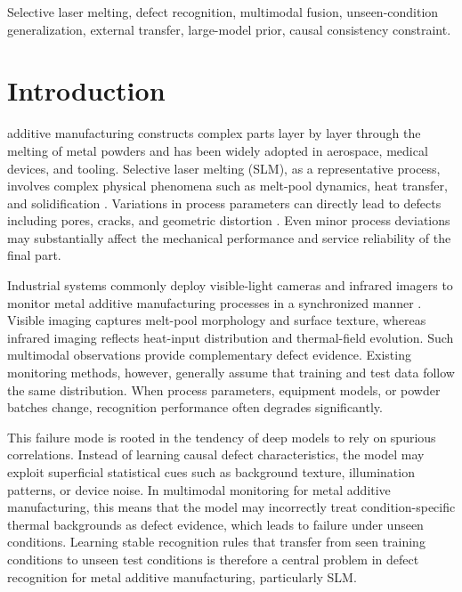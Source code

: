 \documentclass[journal]{IEEEtran}
\begin{document}
\begin{IEEEkeywords}
Selective laser melting, defect recognition, multimodal fusion, unseen-condition generalization, external transfer, large-model prior, causal consistency constraint.
\end{IEEEkeywords}

\section{Introduction}
 additive manufacturing constructs complex parts layer by layer through the melting of metal powders and has been widely adopted in aerospace, medical devices, and tooling. Selective laser melting (SLM), as a representative process, involves complex physical phenomena such as melt-pool dynamics, heat transfer, and solidification \cite{ref_defect_formation_slm}. Variations in process parameters can directly lead to defects including pores, cracks, and geometric distortion \cite{ref_in_situ_monitoring_review}. Even minor process deviations may substantially affect the mechanical performance and service reliability of the final part.

Industrial systems commonly deploy visible-light cameras and infrared imagers to monitor metal additive manufacturing processes in a synchronized manner \cite{ref_lpbf_sensing_review,ref_intelligent_defect_pbf}. Visible imaging captures melt-pool morphology and surface texture, whereas infrared imaging reflects heat-input distribution and thermal-field evolution. Such multimodal observations provide complementary defect evidence. Existing monitoring methods, however, generally assume that training and test data follow the same distribution. When process parameters, equipment models, or powder batches change, recognition performance often degrades significantly.

This failure mode is rooted in the tendency of deep models to rely on spurious correlations. Instead of learning causal defect characteristics, the model may exploit superficial statistical cues such as background texture, illumination patterns, or device noise. In multimodal monitoring for metal additive manufacturing, this means that the model may incorrectly treat condition-specific thermal backgrounds as defect evidence, which leads to failure under unseen conditions. Learning stable recognition rules that transfer from seen training conditions to unseen test conditions is therefore a central problem in defect recognition for metal additive manufacturing, particularly SLM.
\end{document}
